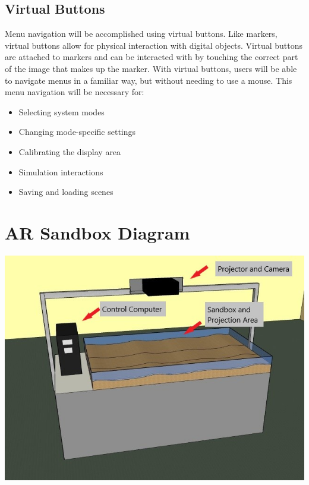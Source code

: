 \documentclass[letterpaper, 10pt, onecolumn, draftclsnofoot]{IEEEtran}
\begin{document}
    \subsection{Virtual Buttons}
        Menu navigation will be accomplished using virtual buttons. Like markers, virtual buttons allow for physical interaction with digital objects. Virtual buttons are attached to markers and can be interacted with by touching the correct part of the image that makes up the marker. With virtual buttons, users will be able to navigate menus in a familiar way, but without needing to use a mouse. This menu navigation will be necessary for:
        \begin{itemize}
            \item Selecting system modes
            \item Changing mode-specific settings
            \item Calibrating the display area
            \item Simulation interactions
            \item Saving and loading scenes
        \end{itemize}

\newpage
\appendices
    \section{AR Sandbox Diagram}
    \label{ARSandboxDiagram}
        \begin{center}
        \includegraphics{ARSandbox.jpg}
        \end{center}
\end{document}

